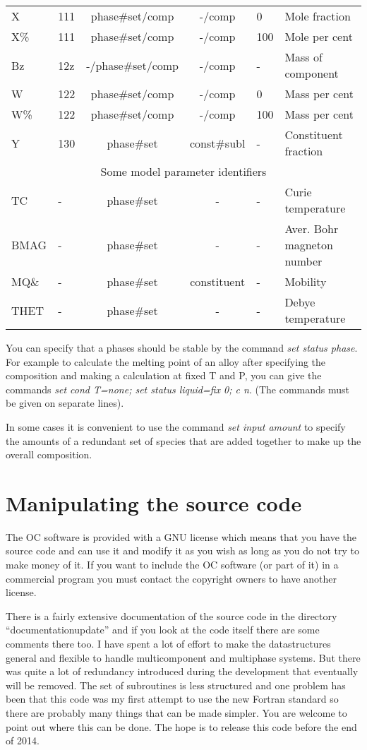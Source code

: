 \documentclass[12pt]{article}
\begin{document}
\begin{table}
\begin{tabular}{|llccll|}
X      & 111 & phase\#set/comp & -/comp & 0  & Mole fraction\\
X\%    & 111 & phase\#set/comp & -/comp & 100 & Mole per cent\\
Bz     & 12z & -/phase\#set/comp & -/comp & -  & Mass of component\\
W      & 122 & phase\#set/comp & -/comp & 0 & Mass per cent\\
W\%    & 122 & phase\#set/comp & -/comp & 100 & Mass per cent\\
Y      & 130 & phase\#set & const\#subl & -& Constituent fraction\\\hline
\multicolumn{6}{|c|}{Some model parameter identifiers}\\\hline
TC     & - & phase\#set & - & - & Curie temperature\\
BMAG   & - & phase\#set & - & - & Aver. Bohr magneton number\\
MQ\&   & - & phase\#set & constituent & - & Mobility\\
THET   & - & phase\#set & - & - & Debye temperature\\\hline
\end{tabular}
\end{table}

You can specify that a phases should be stable by the command {\em set
status phase}.  For example to calculate the melting point of an alloy
after specifying the composition and making a calculation at fixed T
and P, you can give the commands {\em set cond T=none; set status
liquid=fix 0; c n}.  (The commands must be given on separate lines).

In some cases it is convenient to use the command {\em set input
amount} to specify the amounts of a redundant set of species that are
added together to make up the overall composition.

\section{Manipulating the source code}

The OC software is provided with a GNU license which means that you
have the source code and can use it and modify it as you wish as long
as you do not try to make money of it.  If you want to include the OC
software (or part of it) in a commercial program you must contact the
copyright owners to have another license.

There is a fairly extensive documentation of the source code in the
directory ``documentationupdate'' and if you look at the code itself
there are some comments there too.  I have spent a lot of effort to
make the datastructures general and flexible to handle multicomponent
and multiphase systems.  But there was quite a lot of redundancy
introduced during the development that eventually will be removed.
The set of subroutines is less structured and one problem has been
that this code was my first attempt to use the new Fortran standard so
there are probably many things that can be made simpler.  You are
welcome to point out where this can be done.  The hope is to release
this code before the end of 2014.
\end{document}
